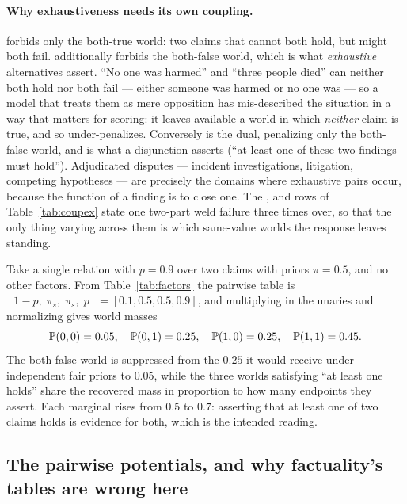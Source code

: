 \paragraph{Why exhaustiveness needs its own coupling.} \con{} forbids only the both-true world: two
claims that cannot both hold, but might both fail. \exc{} additionally forbids the both-false
world, which is what \emph{exhaustive} alternatives assert. ``No one was harmed'' and ``three
people died'' can neither both hold nor both fail --- either someone was harmed or no one was ---
so a model that treats them as mere opposition has mis-described the situation in a way that
matters for scoring: it leaves available a world in which \emph{neither} claim is true, and so
under-penalizes. Conversely \cnc{} is the dual, penalizing only the both-false world, and is what a
disjunction asserts (``at least one of these two findings must hold''). Adjudicated disputes ---
incident investigations, litigation, competing hypotheses --- are precisely the domains where
exhaustive pairs occur, because the function of a finding is to close one. The \con{}, \exc{} and
\cnc{} rows of Table~\ref{tab:coupex} state one two-part weld failure three times over, so that
the only thing varying across them is which same-value worlds the response leaves standing.

\begin{example}
\label{ex-cnc}
Take a single \cnc{} relation with $p=0.9$ over two claims with priors $\pi=0.5$, and no other
factors. From Table~\ref{tab:factors} the pairwise table is $[1-p,\;\pi_s,\;\pi_s,\;p]
=[0.1,0.5,0.5,0.9]$, and multiplying in the unaries and normalizing gives world masses
\[
\mathbb{P}\!\left( 0,0 \right)=0.05,\quad \mathbb{P}\!\left( 0,1 \right)=0.25,\quad \mathbb{P}\!\left( 1,0 \right)=0.25,\quad \mathbb{P}\!\left( 1,1 \right)=0.45 .
\]
The both-false world is suppressed from the $0.25$ it would receive under independent fair priors
to $0.05$, while the three worlds satisfying ``at least one holds'' share the recovered mass in
proportion to how many endpoints they assert. Each marginal rises from $0.5$ to $0.7$: asserting
that at least one of two claims holds is evidence for both, which is the intended reading.
\end{example}

\subsection{The pairwise potentials, and why factuality's tables are wrong here}
\label{sec-potentials}

